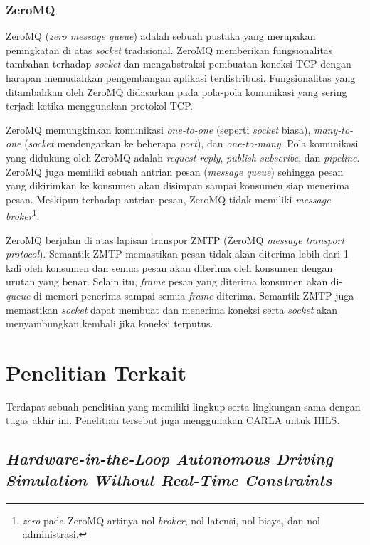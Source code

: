 \subsubsection{ZeroMQ}

ZeroMQ (\textit{zero message queue}) adalah sebuah pustaka yang merupakan
pe\-ning\-ka\-tan di atas \textit{socket} tradisional. ZeroMQ memberikan
fungsionalitas tambahan terhadap \textit{socket} dan mengabstraksi pembuatan
koneksi TCP dengan harapan memudahkan pengembangan aplikasi terdistribusi.
Fungsionalitas yang ditambahkan oleh ZeroMQ didasarkan pada pola-pola komunikasi
yang sering terjadi ketika menggunakan protokol TCP.

ZeroMQ memungkinkan komunikasi \textit{one-to-one} (seperti \textit{socket}
biasa), \textit{many-to-one} (\textit{socket} mendengarkan ke beberapa
\textit{port}), dan \textit{one-to-many}. Pola komunikasi yang didukung oleh
ZeroMQ adalah \textit{request-reply}, \textit{publish-subscribe}, dan
\textit{pipeline}. ZeroMQ juga memiliki sebuah antrian pesan (\textit{message
    queue}) sehingga pesan yang dikirimkan ke konsumen akan disimpan
sampai konsumen siap menerima pesan. Meskipun terhadap antrian pesan, ZeroMQ
tidak memiliki \textit{message broker}\footnote{\textit{zero} pada ZeroMQ
    artinya nol \textit{broker}, nol latensi, nol biaya, dan nol administrasi.}.

ZeroMQ berjalan di atas lapisan transpor ZMTP (ZeroMQ \textit{message transport
    protocol}). Semantik ZMTP memastikan pesan tidak akan diterima lebih dari 1 kali
oleh konsumen dan semua pesan akan diterima oleh konsumen dengan urutan yang
benar. Selain itu, \textit{frame} pesan yang diterima konsumen akan
di-\textit{queue} di memori penerima sampai semua \textit{frame} diterima.
Semantik ZMTP juga memastikan \textit{socket} dapat membuat dan menerima koneksi
serta \textit{socket} akan menyambungkan kembali jika koneksi terputus.

\section{Penelitian Terkait}

Terdapat sebuah penelitian yang memiliki lingkup serta lingkungan sama dengan
tugas akhir ini. Penelitian tersebut juga menggunakan CARLA untuk HILS.

\subsection{\textit{Hardware-in-the-Loop Autonomous Driving Simulation Without
        Real-Time Constraints}}

